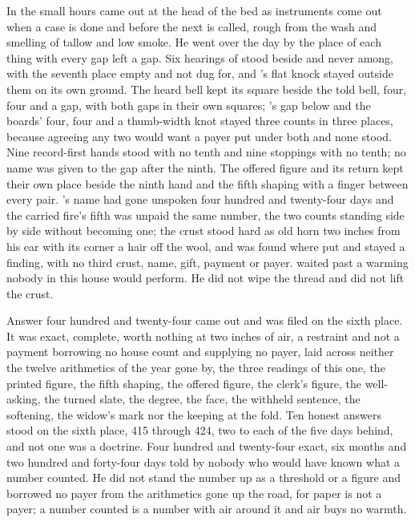 In the small hours  came out at the head of the bed as instruments come out when a case is done and before the next is called, rough from the wash and smelling of tallow and low smoke. He went over the day by the place of each thing with every gap left a gap. Six hearings of  stood beside and never among, with the seventh place empty and not dug for, and 's flat knock stayed outside them on its own ground. The heard bell kept its square beside the told bell, four, four and a gap, with both gaps in their own squares; 's gap below  and the boards' four, four and a thumb-width knot stayed three counts in three places, because agreeing any two would want a payer put under both and none stood. Nine record-first hands stood with no tenth and nine stoppings with no tenth; no name was given to the gap after the ninth. The offered figure and its return kept their own place beside the ninth hand and the fifth shaping with a finger between every pair. 's name had gone unspoken four hundred and twenty-four days and the carried fire's fifth was unpaid the same number, the two counts standing side by side without becoming one; the crust stood hard as old horn two inches from his ear with its corner a hair off the wool, and  was found where put and stayed a finding, with no third crust, name, gift, payment or payer.  waited past a warming nobody in this house would perform. He did not wipe the thread and did not lift the crust.

Answer four hundred and twenty-four came out and was filed on the sixth place. It was exact, complete, worth nothing at two inches of air, a restraint and not a payment borrowing no house count and supplying no payer, laid across neither the twelve arithmetics of the year gone by, the three readings of this one, the printed figure, the fifth shaping, the offered figure, the clerk's figure, the well-asking, the turned slate, the degree, the face, the withheld sentence, the softening, the widow's mark nor the keeping at the fold. Ten honest answers stood on the sixth place, 415 through 424, two to each of the five days behind, and not one was a doctrine. Four hundred and twenty-four exact, six months and two hundred and forty-four days told by nobody who would have known what a number counted. He did not stand the number up as a threshold or a figure and borrowed no payer from the arithmetics gone up the road, for paper is not a payer; a number counted is a number with air around it and air buys no warmth.

